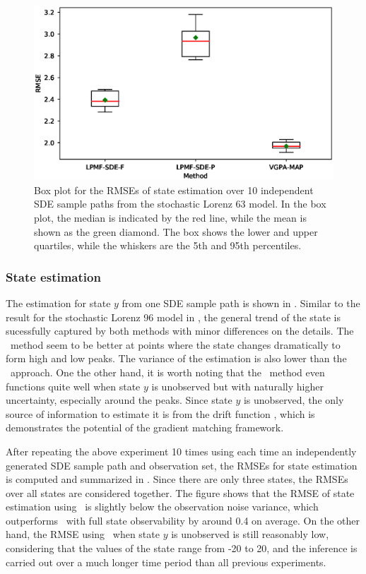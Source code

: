 \begin{figure}
    \centering
    \includegraphics[width=0.8\linewidth]{graphics/lorenz-63-states-boxplot}
    \caption{Box plot for the RMSEs of state estimation over 10 independent SDE sample paths from the stochastic Lorenz 63 model. In the box plot, the median is indicated by the red line, while the mean is shown as the green diamond. The box shows the lower and upper quartiles, while the whiskers are the 5th and 95th percentiles.}
    \label{fig-lorenz-63-state-boxplot}
\end{figure}

\subsubsection*{State estimation}

The estimation for state $y$ from one SDE sample path is shown in .
Similar to the result for the stochastic Lorenz 96 model in , the general trend of the state is sucessfully captured by both methods with minor differences on the details.
The \algovgpamap\ method seem to be better at points where the state changes dramatically to form high and low peaks.
The variance of the estimation is also lower than the \algolpmfsde\ approach.
One the other hand, it is worth noting that the \algolpmfsde\ method even functions quite well when state $y$ is unobserved but with naturally higher uncertainty, especially around the peaks.
Since state $y$ is unobserved, the only source of information to estimate it is from the drift function , which is demonstrates the potential of the gradient matching framework.

After repeating the above experiment 10 times using each time an independently generated SDE sample path and observation set, the RMSEs for state estimation is computed and summarized in .
Since there are only three states, the RMSEs over all states are considered together.
The figure shows that the RMSE of state estimation using \algovgpamap\ is slightly below the observation noise variance, which outperforms \algolpmfsde\ with full state observability by around 0.4 on average.
On the other hand, the RMSE using \algolpmfsde\ when state $y$ is unobserved is still reasonably low, considering that the values of the state range from -20 to 20, and the inference is carried out over a much longer time period than all previous experiments.

